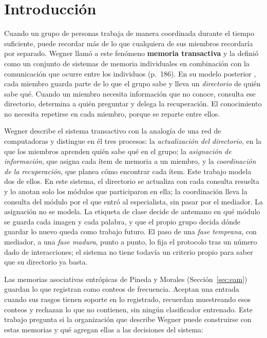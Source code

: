 \section{Introducción}
\label{sec:introduccion}

Cuando un grupo de personas trabaja de manera coordinada durante el tiempo suficiente,
puede recordar más de lo que cualquiera de sus miembros recordaría por separado.
Wegner \cite{wegner1987transactive} llamó a este fenómeno \textbf{memoria transactiva}
y la definió como un conjunto de sistemas de memoria individuales en combinación con la
comunicación que ocurre entre los individuos (p.~186).
En su modelo posterior \cite{wegner1995computer}, cada miembro guarda parte de lo que
el grupo sabe y lleva un \emph{directorio} de quién sabe qué.
Cuando un miembro necesita información que no conoce, consulta ese directorio,
determina a quién preguntar y delega la recuperación.
El conocimiento no necesita repetirse en cada miembro, porque se reparte entre ellos.

Wegner \cite{wegner1995computer} describe el sistema transactivo con la analogía de una
red de computadoras y distingue en él tres procesos: la \emph{actualización del
directorio}, en la que los miembros aprenden quién sabe qué en el grupo; la
\emph{asignación de información}, que asigna cada ítem de memoria a un miembro, y la
\emph{coordinación de la recuperación}, que planea cómo encontrar cada ítem.
Este trabajo modela dos de ellos.
En este sistema, el directorio se actualiza con cada consulta resuelta y lo anotan solo
los módulos que participaron en ella; la coordinación lleva la consulta del módulo por
el que entró al especialista, sin pasar por el mediador.
La asignación no se modela.
La etiqueta de clase decide de antemano en qué módulo se guarda cada imagen y cada
palabra, y que el propio grupo decida dónde guardar lo nuevo queda como trabajo futuro.
El paso de una \emph{fase temprana}, con mediador, a una \emph{fase madura}, punto a
punto, lo fija el protocolo tras un número dado de interacciones; el sistema no tiene
todavía un criterio propio para saber que su directorio ya basta.

Las memorias asociativas entrópicas de Pineda y Morales (Sección~\ref{sec:eam}) guardan
lo que registran como conteos de frecuencia.
Aceptan una entrada cuando sus rasgos tienen soporte en lo registrado, recuerdan
muestreando esos conteos y rechazan lo que no contienen, sin ningún clasificador
entrenado.
Este trabajo pregunta si la organización que describe Wegner puede construirse con
estas memorias y qué agregan ellas a las decisiones del sistema:

